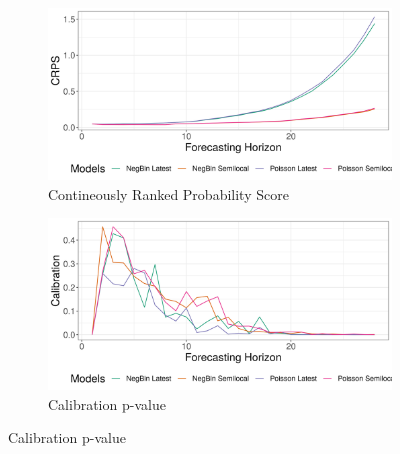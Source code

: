 \begin{figure}[H]
\begin{subfigure}{0.5\textwidth}
  \centering
  \includegraphics[width=\linewidth]{../output/Alimbongo_crps.png}  
  \caption{Contineously Ranked Probability Score}
  \label{fig:sub-first}
\end{subfigure}
\begin{subfigure}{0.5\textwidth}
  \centering
  \includegraphics[width=\linewidth]{../output/Alimbongo_calibration.png}  
  \caption{Calibration p-value}
  \label{fig:sub-second}
\end{subfigure}


\end{figure}
